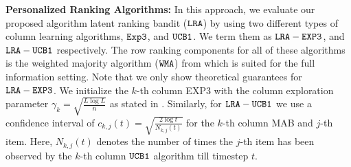 \textbf{Personalized Ranking Algorithms:} In this approach, we evaluate our proposed algorithm latent ranking bandit (${\tt LRA}$) by using two different types of column learning algorithms, ${\tt Exp3}$,  and ${\tt UCB1}$. We term them as ${\tt LRA-EXP3}$, and ${\tt LRA-UCB1}$ respectively. The row ranking components for all of these algorithms is the weighted majority algorithm (${\tt WMA}$) from \citet{littlestone1994weighted} which is suited for the full information setting. Note that we only show theoretical guarantees for ${\tt LRA-EXP3}$. We initialize the $k$-th column EXP3 with the column exploration parameter $\gamma_k = \sqrt{\frac{L \log L}{n}}$ as stated in \citet{auer2002nonstochastic}. Similarly, for ${\tt LRA-UCB1}$ we use  a confidence interval of $c_{k, j}(t) = \sqrt{\frac{2\log t}{N_{k,j}(t)}}$  for the $k$-th column MAB and $j$-th item. Here, $N_{k, j}(t)$ denotes the number of times the $j$-th item has been observed by the $k$-th column ${\tt UCB1}$ algorithm till timestep $t$.



%



